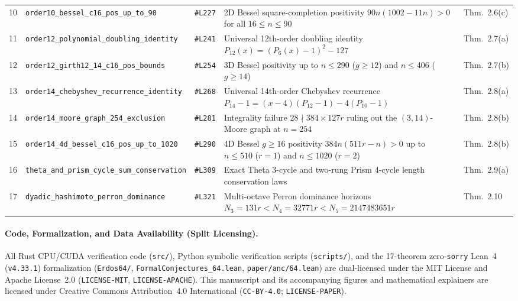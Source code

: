 \documentclass[10pt,a4paper]{article}
\theoremstyle{definition}
\theoremstyle{remark}
\begin{document}
\begin{table}[t]
{\begin{tabular}{rllp{6.2cm}l}
10 & \texttt{order10\_bessel\_c16\_pos\_up\_to\_90} & \texttt{\#L227} & 2D Bessel square-completion positivity $90n(1002-11n) > 0$ for all $16 \le n \le 90$ & Thm.~2.6(c) \\
11 & \texttt{order12\_polynomial\_doubling\_identity} & \texttt{\#L241} & Universal 12th-order doubling identity $P_{12}(x) = (P_6(x)-1)^2 - 127$ & Thm.~2.7(a) \\
12 & \texttt{order12\_girth12\_14\_c16\_pos\_bounds} & \texttt{\#L254} & 3D Bessel positivity up to $n \le 290$ ($g \ge 12$) and $n \le 406$ ($g \ge 14$) & Thm.~2.7(b) \\
13 & \texttt{order14\_chebyshev\_recurrence\_identity} & \texttt{\#L268} & Universal 14th-order Chebyshev recurrence $P_{14}-1 = (x-4)(P_{12}-1)-4(P_{10}-1)$ & Thm.~2.8(a) \\
14 & \texttt{order14\_moore\_graph\_254\_exclusion} & \texttt{\#L281} & Integrality failure $28 \nmid 384 \times 127r$ ruling out the $(3,14)$-Moore graph at $n=254$ & Thm.~2.8(b) \\
15 & \texttt{order14\_4d\_bessel\_c16\_pos\_up\_to\_1020} & \texttt{\#L290} & 4D Bessel $g \ge 16$ positivity $384n(511r-n) > 0$ up to $n \le 510$ ($r=1$) and $n \le 1020$ ($r=2$) & Thm.~2.8(b) \\
16 & \texttt{theta\_and\_prism\_cycle\_sum\_conservation} & \texttt{\#L309} & Exact Theta 3-cycle and two-rung Prism 4-cycle length conservation laws & Thm.~2.9(a) \\
17 & \texttt{dyadic\_hashimoto\_perron\_dominance} & \texttt{\#L321} & Multi-octave Perron dominance horizons $N_3=131r < N_4=32771r < N_5=2147483651r$ & Thm.~2.10 \\
\bottomrule
\end{tabular}%
}
\end{table}

\paragraph{Code, Formalization, and Data Availability (Split Licensing).}
All Rust CPU/CUDA verification code (\texttt{src/}), Python symbolic verification scripts (\texttt{scripts/}), and the 17-theorem zero-\texttt{sorry} Lean~4 (\texttt{v4.33.1}) formalization (\texttt{Erdos64/}, \texttt{FormalConjectures\_64.lean}, \texttt{paper/anc/64.lean}) are dual-licensed under the MIT License and Apache License~2.0 (\texttt{LICENSE-MIT}, \texttt{LICENSE-APACHE}). This manuscript and its accompanying figures and mathematical explainers are licensed under Creative Commons Attribution~4.0 International (\texttt{CC-BY-4.0}; \texttt{LICENSE-PAPER}).



\end{document}
